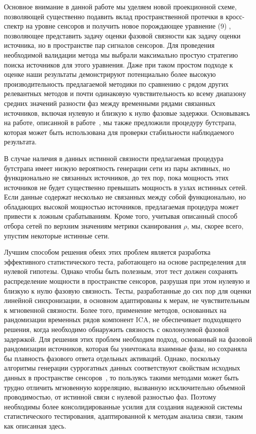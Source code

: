 Основное внимание в данной работе мы уделяем новой проекционной схеме,
позволяющей существенно подавить вклад пространственной протечки в кросс-спектр на уровне сенсоров
и получить новое порождающее уравнение (9) %
, позволяющее представить задачу
оценки фазовой связности как задачу оценки источника, но в пространстве пар
сигналов сенсоров. Для проведения необходимой валидации метода мы
выбрали максимально простую стратегию поиска источников для этого уравнения.
Даже при таком простом подходе к оценке наши результаты демонстрируют потенциально
более высокую производительность предлагаемой методики по сравнению с рядом
других релевантных методов и почти одинаковую чувствительность ко всему
диапазону средних значений разности фаз между временными рядами связанных
источников, включая нулевую и близкую к нулю фазовые задержки. Основываясь на
работе, описанной в работе~\cite{Darvas2005}, мы также предложили процедуру
бутстрапа, которая может быть использована для проверки стабильности
наблюдаемого результата.

В случае наличия в данных истинной связности предлагаемая процедура бутстрапа 
имеет низкую вероятность генерации сети из пары активных, но функционально
не связанных источников, до тех пор, пока мощность этих источников
не будет существенно превышать мощность в узлах истинных сетей.
Если данные содержат несколько не связанных между собой функционально, но
обладающих высокой мощностью
источников, предлагаемая процедура может привести к ложным срабатываниям. Кроме
того, учитывая описанный способ отбора сетей по верхним значениям метрики
сканирования $\rho$, мы, скорее всего, упустим некоторые истинные сети.

Лучшим способом решения обеих этих проблем является разработка эффективного
статистического теста, работающего на основе распределения для нулевой гипотезы.
Однако чтобы быть полезным, этот тест должен сохранять распределение мощности
в пространстве сенсоров, разрушая при этом нулевую и близкую к нулю
фазовую связность. Тесты, разработанные до сих пор для оценки линейной
синхронизации, в основном адаптированы к мерам, не чувствительным к мгновенной
связности. Более того, применение методов, основанных на рандомизации временных
рядов компонент ICA, не обеспечивает подходящего решения, когда необходимо
обнаружить связность с околонулевой фазовой задержкой. Для решения этих проблем необходим
подход, основанный на фазовой рандомизации источников,
которая бы уничтожала взаимные фазы, но сохраняла бы плавность фазового ответа
отдельных активаций. Однако, поскольку алгоритмы генерации суррогатных данных
соответствуют свойствам исходных данных в пространстве сенсоров~\cite{Haufe_Evald_2016},
то пользуясь такими методами может быть трудно отличить мгновенную корреляцию,
вызванную исключительно объемной проводимостью, от истинной связи с нулевой разностью фаз.
Поэтому необходимы более консолидированные усилия для создания надежной системы
статистического тестирования, адаптированной к методам анализа связи, таким как
описанная здесь.

